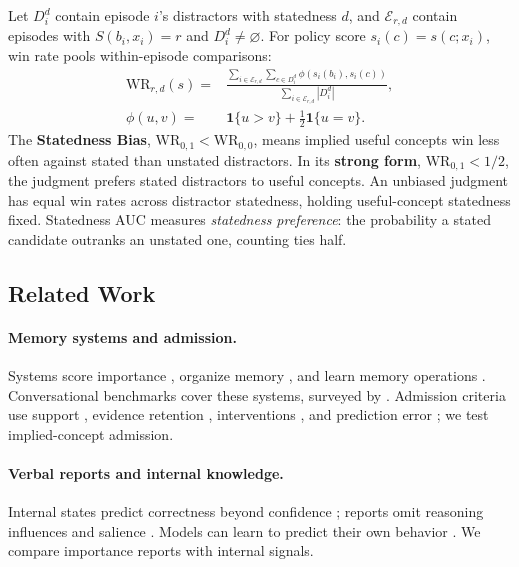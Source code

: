 Let $D_i^d$ contain episode $i$'s distractors with statedness $d$, and $\mathcal E_{r,d}$ contain episodes with $S(b_i,x_i)=r$ and $D_i^d\neq\varnothing$. For policy score $s_i(c)=s(c;x_i)$, win rate pools within-episode comparisons:
\begin{equation}
\begin{split}
\mathrm{WR}_{r,d}(s)={}&\frac{\sum_{i\in\mathcal E_{r,d}}\sum_{c\in D_i^d}\phi(s_i(b_i),s_i(c))}{\sum_{i\in\mathcal E_{r,d}}|D_i^d|},\\
\phi(u,v)={}&\mathbf{1}\{u>v\}+\tfrac12\mathbf{1}\{u=v\}.
\end{split}
\label{eq:winrate}
\end{equation}
The \textbf{Statedness Bias}, $\mathrm{WR}_{0,1}<\mathrm{WR}_{0,0}$, means implied useful concepts win less often against stated than unstated distractors. In its \textbf{strong form}, $\mathrm{WR}_{0,1}<1/2$, the judgment prefers stated distractors to useful concepts. An unbiased judgment has equal win rates across distractor statedness, holding useful-concept statedness fixed. Statedness AUC measures \emph{statedness preference}: the probability a stated candidate outranks an unstated one, counting ties half.

\subsection{Related Work}\label{sec:relwork}

\paragraph{Memory systems and admission.}
Systems score importance \citep{park2023generative}, organize memory \citep{zhong2023memorybank,packer2023memgpt,mem0,amem2025}, and learn memory operations \citep{memcon2026,agemem2026}. Conversational benchmarks \citep{maharana2024locomo,wu2025longmemeval} cover these systems, surveyed by \citet{hu2025memorysurvey}. Admission criteria use support \citep{consistencygate2026,amac2026}, evidence retention \citep{valuemodel2026}, interventions \citep{cmi2026}, and prediction error \citep{nemori2026}; we test implied-concept admission.

\paragraph{Verbal reports and internal knowledge.}
Internal states predict correctness beyond confidence \citep{kadavath2022know,azaria2023internal,orgad2024llmsknow}; reports omit reasoning influences and salience \citep{turpin2023cot,trienes2025salience}. Models can learn to predict their own behavior \citep{binder2024introspection}. We compare importance reports with internal signals.

